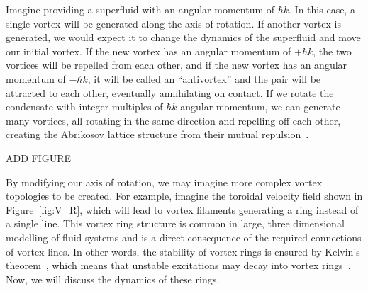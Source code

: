 Imagine providing a superfluid with an angular momentum of $\hbar k$.
In this case, a single vortex will be generated along the axis of rotation.
If another vortex is generated, we would expect it to change the dynamics of the superfluid and move our initial vortex.
If the new vortex has an angular momentum of $+\hbar k$, the two vortices will be repelled from each other, and if the new vortex has an angular momentum of  $-\hbar k$, it will be called an ``antivortex'' and the pair will be attracted to each other, eventually annihilating on contact.
If we rotate the condensate with integer multiples of $\hbar k$ angular momentum, we can generate many vortices, all rotating in the same direction and repelling off each other, creating the Abrikosov lattice structure from their mutual repulsion~\cite{Fetter2010}.

ADD FIGURE

By modifying our axis of rotation, we may imagine more complex vortex topologies to be created. 
For example, imagine the toroidal velocity field shown in Figure~\ref{fig:V_R}, which will lead to  vortex filaments generating a ring instead of a single line. 
This vortex ring structure is common in large, three dimensional modelling of fluid systems and is a direct consequence of the required connections of vortex lines.
In other words, the stability of vortex rings is ensured by Kelvin's theorem~\cite{Donnelly1991}, which means that unstable excitations may decay into vortex rings~\cite{Anderson2001}.
Now, we will discuss the dynamics of these rings.

